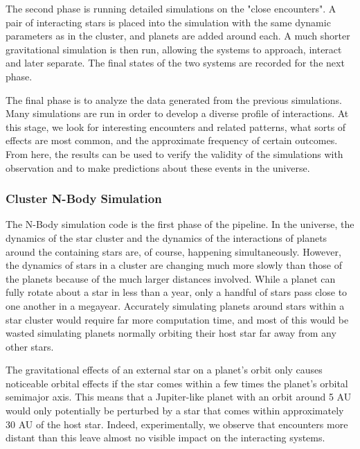 \documentclass[12pt]{article}
\begin{document}
    The second phase is running detailed simulations on the "close encounters". 
    A pair of interacting stars
    is placed into the simulation with the same dynamic parameters as in the cluster,
    and planets are added around each. A much shorter gravitational simulation is then
    run, allowing the systems to approach, interact and later separate. The final
    states of the two systems are recorded for the next phase.

    The final phase is to analyze the data generated from the previous simulations.
    Many simulations are run in order to develop a diverse profile of interactions.
    At this stage, we look for interesting encounters and related patterns, 
    what sorts of effects are most common,
    and the approximate frequency of certain outcomes. From here, the results can
    be used to verify the validity of the simulations with observation and to make
    predictions about these events in the universe.

    \subsubsection{Cluster N-Body Simulation}

    The N-Body simulation code is the first phase of the pipeline. In the
    universe, the dynamics of the star cluster and the dynamics of the
    interactions of planets around the containing stars are, of course, happening
    simultaneously. However, the dynamics of stars in a cluster are changing much
    more slowly than those of the planets because of the much larger distances
    involved. While a planet can fully rotate about a star in less than a year,
    only a handful of stars pass close to one another in a megayear. Accurately
    simulating planets around stars within a star cluster would require
    far more computation time, and most of this would be wasted simulating
    planets normally orbiting their host star far away from any other stars.

    The gravitational effects of an external star on a planet's orbit only
    causes noticeable orbital effects if the star comes within a few times the
    planet's orbital semimajor axis. This means that a Jupiter-like planet with an orbit around
    5 AU would only potentially be perturbed by a star that comes within 
    approximately 30 AU of the host star. Indeed, experimentally, we observe that
    encounters more distant than this leave almost no visible impact on the
    interacting systems. 
\end{document}
